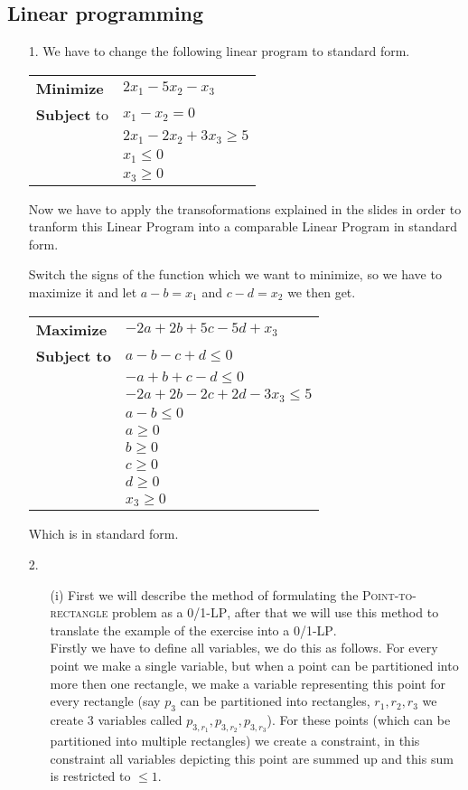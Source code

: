 \documentclass{article}
\begin{document}
\subsection*{Linear programming}\begin{itemize}
\item[1.] We have to change the following linear program to standard form.

\begin{tabular}{l l}
\textbf{Minimize} & $2x_1-5x_2-x_3$ \\
\textbf{Subject} to & $x_1 - x_2=0$ \\
& $2x_1-2x_2+3x_3 \ge 5$ \\
& $x_1 \le 0$ \\
& $x_3 \ge 0$ \\
\end{tabular}

Now we have to apply the transoformations explained in the slides in order to tranform this Linear Program into a comparable Linear Program in standard form.

Switch the signs of the function which we want to minimize, so we have to maximize it and let $a-b=x_1$ and $c-d=x_2$ we then get.

\begin{tabular}{l l}
\textbf{Maximize} & $-2a+2b+5c-5d+x_3$ \\
\textbf{Subject to} & $a-b - c+d\le0$ \\
 & $-a+b + c-d\le0$ \\
& $-2a+2b-2c+2d-3x_3 \le 5$ \\
& $a-b \le 0$ \\
& $a \ge 0$ \\
& $b \ge 0$ \\
& $c \ge 0$ \\
& $d\ge 0$ \\
& $x_3 \ge 0$ \\
\end{tabular}

Which is in standard form.

\item[2.]
\begin{itemize}
\item[(i)] First we will describe the method of formulating the \textsc{Point-to-rectangle} problem as a 0/1-\textsc{LP}, after that we will use this method to translate the example of the exercise into a 0/1-\textsc{LP}. \\

Firstly we have to define all variables, we do this as follows. For every point we make a single variable, but when a point can be partitioned into more then one rectangle, we make a variable representing this point for every rectangle (say $p_3$ can be partitioned into rectangles, $r_1,r_2,r_3$ we create 3 variables called $p_{3,r_1},p_{3,r_2},p_{3,r_3}$). For these points (which can be partitioned into multiple rectangles) we create a constraint, in this constraint all variables depicting this point are summed up and this sum is restricted to $\le1$. \\


\end{itemize}
\end{itemize}
\end{document}

